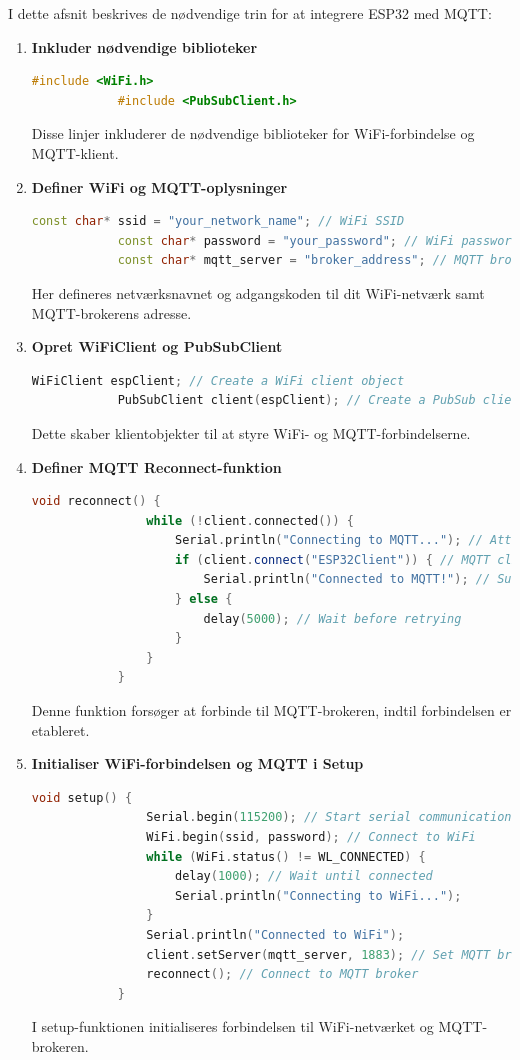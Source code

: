 \documentclass[12pt,a4paper]{book}
\begin{document}
	I dette afsnit beskrives de nødvendige trin for at integrere ESP32 med MQTT:
	
	\begin{enumerate}
		\item \textbf{Inkluder nødvendige biblioteker}
		\begin{lstlisting}[language=C++, caption=Syntaks]
			#include <WiFi.h>
			#include <PubSubClient.h>
		\end{lstlisting}
		Disse linjer inkluderer de nødvendige biblioteker for WiFi-forbindelse og MQTT-klient.
		
		\item \textbf{Definer WiFi og MQTT-oplysninger}
		\begin{lstlisting}[language=C++, caption=Syntaks]
			const char* ssid = "your_network_name"; // WiFi SSID
			const char* password = "your_password"; // WiFi password
			const char* mqtt_server = "broker_address"; // MQTT broker address
		\end{lstlisting}
		Her defineres netværksnavnet og adgangskoden til dit WiFi-netværk samt MQTT-brokerens adresse.
		
		\item \textbf{Opret WiFiClient og PubSubClient}
		\begin{lstlisting}[language=C++, caption=Syntaks]
			WiFiClient espClient; // Create a WiFi client object
			PubSubClient client(espClient); // Create a PubSub client object
		\end{lstlisting}
		Dette skaber klientobjekter til at styre WiFi- og MQTT-forbindelserne.
		
		\item \textbf{Definer MQTT Reconnect-funktion}
		\begin{lstlisting}[language=C++, caption=Syntaks]
			void reconnect() {
				while (!client.connected()) {
					Serial.println("Connecting to MQTT..."); // Attempt to connect to MQTT broker
					if (client.connect("ESP32Client")) { // MQTT client ID
						Serial.println("Connected to MQTT!"); // Success message
					} else {
						delay(5000); // Wait before retrying
					}
				}
			}
		\end{lstlisting}
		Denne funktion forsøger at forbinde til MQTT-brokeren, indtil forbindelsen er etableret.
		
		\item \textbf{Initialiser WiFi-forbindelsen og MQTT i Setup}
		\begin{lstlisting}[language=C++, caption=Syntaks]
			void setup() {
				Serial.begin(115200); // Start serial communication
				WiFi.begin(ssid, password); // Connect to WiFi
				while (WiFi.status() != WL_CONNECTED) {
					delay(1000); // Wait until connected
					Serial.println("Connecting to WiFi...");
				}
				Serial.println("Connected to WiFi");
				client.setServer(mqtt_server, 1883); // Set MQTT broker and port
				reconnect(); // Connect to MQTT broker
			}
		\end{lstlisting}
		I setup-funktionen initialiseres forbindelsen til WiFi-netværket og MQTT-brokeren.
		

\end{enumerate}
\end{document}
